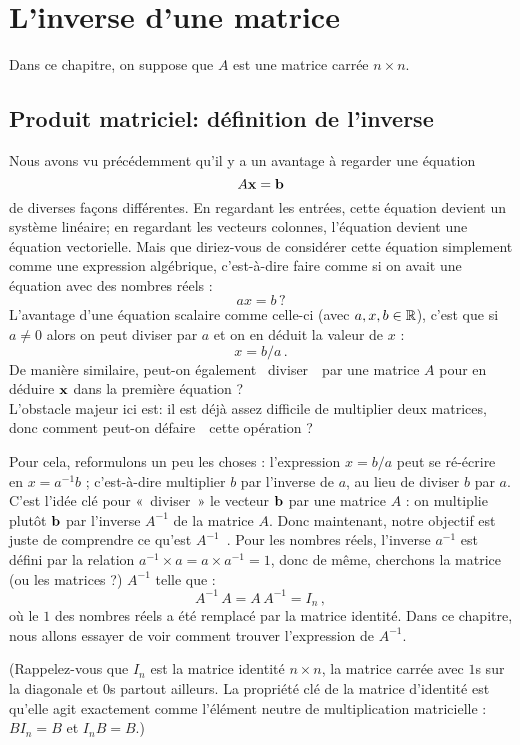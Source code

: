 \chapter{L'inverse d'une matrice}
\label{chapter:Fr_20-inverses}
 

Dans ce chapitre, on suppose que $A$ est une matrice carrée $n \times n$.


\section{Produit matriciel: d\'efinition de l'inverse}

 

 
Nous avons vu précédemment qu'il y a un avantage à regarder 
une équation $$A\mathbf{x}=\mathbf{b}$$ de diverses façons différentes.  En regardant les entrées, cette équation devient un système linéaire; en regardant les vecteurs colonnes, l'équation devient une
équation vectorielle.  Mais que diriez-vous de considérer cette équation simplement
comme une expression algébrique, c'est-à-dire faire comme si on avait une équation avec des nombres réels :
$$
ax=b\, ?
$$
L'avantage d'une équation scalaire comme celle-ci (avec $a,x,b\in \mathbb{R}$),
c'est que si $a\neq 0$ alors on peut diviser par $a$ et on en déduit la valeur de $x$ : $$x = b/a\,.$$  De manière similaire, peut-on également \og \ diviser\ \fg\ par
une matrice $A$ pour en déduire $\mathbf{x}$ dans la première équation ?\\

L'obstacle majeur ici est: il est déjà assez difficile de multiplier
deux matrices, donc comment peut-on \og d\'efaire\ \fg\ cette opération ? 

Pour cela, reformulons un peu les choses : l'expression $x = b/a$ peut se ré-écrire en $x = a^{-1}b$ ;
c'est-à-dire multiplier $b$ par l'inverse de $a$, au lieu de diviser $b$ par $a$. C'est l'idée clé pour «~diviser~» le vecteur $\mathbf{b}$ par une matrice $A$ : on multiplie plutôt $\mathbf{b}$ par l'inverse $A^{-1}$ de la matrice $A$.  Donc maintenant, notre objectif
est juste de comprendre ce qu'est \og $A^{-1}$\ \fg. Pour les nombres réels, l'inverse $a^{-1}$ est défini par la relation $a^{-1}\times a = a\times a^{-1} = 1$, donc de même, cherchons la matrice (ou les matrices ?) $A^{-1}$ telle que :
$$
A^{-1}\, A = A\, A^{-1} = I_n\,,
$$
où le $1$ des nombres réels a été remplacé par la matrice identité. Dans ce chapitre, nous allons essayer de voir comment trouver l'expression de $A^{-1}$.

(Rappelez-vous que $I_n$ est la matrice identité $n\times n$, la matrice carrée
avec $1$s sur la diagonale et $0$s partout ailleurs.  La propriété clé
de la matrice d'identité est qu'elle agit exactement comme l'\'el\'ement neutre 
de multiplication matricielle : $BI_n = B$ et $I_nB = B$.)

